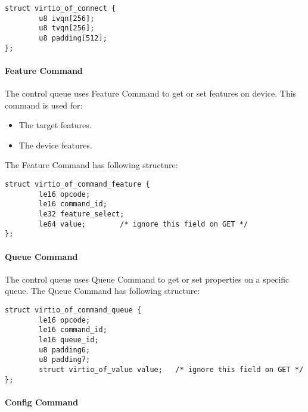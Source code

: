 \begin{lstlisting}
struct virtio_of_connect {
        u8 ivqn[256];
        u8 tvqn[256];
        u8 padding[512];
};
\end{lstlisting}

\paragraph{Feature Command}\label{sec:Virtio Transport Options / Virtio Over Fabrics / Transmition Protocol / Commands Definition / Feature Command}

The control queue uses Feature Command to get or set features on device. This command is used for:

\begin{itemize}
\item The target features.
\item The device features.
\end{itemize}

The Feature Command has following structure:

\begin{lstlisting}
struct virtio_of_command_feature {
        le16 opcode;
        le16 command_id;
        le32 feature_select;
        le64 value;        /* ignore this field on GET */
};
\end{lstlisting}

\paragraph{Queue Command}\label{sec:Virtio Transport Options / Virtio Over Fabrics / Transmition Protocol / Commands Definition / Queue Command}

The control queue uses Queue Command to get or set properties on a specific queue. The Queue Command has following structure:

\begin{lstlisting}
struct virtio_of_command_queue {
        le16 opcode;
        le16 command_id;
        le16 queue_id;
        u8 padding6;
        u8 padding7;
        struct virtio_of_value value;   /* ignore this field on GET */
};
\end{lstlisting}


\paragraph{Config Command}\label{sec:Virtio Transport Options / Virtio Over Fabrics / Transmition Protocol / Commands Definition / Config Command}

